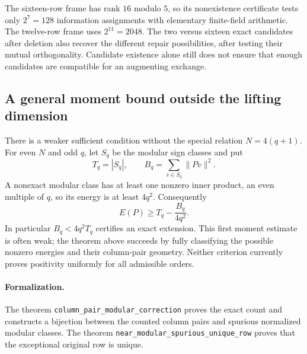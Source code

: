 The sixteen-row frame has rank $16$ modulo $5$, so its nonexistence
certificate tests only $2^7=128$ information assignments with elementary
finite-field arithmetic. The twelve-row frame uses $2^{11}=2048$.
The two versus sixteen exact candidates after deletion also recover
the different repair possibilities, after testing their mutual
orthogonality. Candidate existence alone still does not ensure that
enough candidates are compatible for an augmenting exchange.

\subsection{A general moment bound outside the lifting dimension}
There is a weaker sufficient condition without the special relation
$N=4(q+1)$. For even $N$ and odd $q$, let $S_q$ be the modular sign
classes and put
\[
 T_q=|S_q|,\qquad B_q=\sum_{v\in S_q}\|Pv\|^2.
\]
A nonexact modular class has at least one nonzero inner product, an
even multiple of $q$, so its energy is at least $4q^2$. Consequently
\[
 E(P)\ge T_q-\frac{B_q}{4q^2}.
\]
In particular $B_q<4q^2T_q$ certifies an exact extension. This first
moment estimate is often weak; the theorem above succeeds by fully
classifying the possible nonzero energies and their column-pair
geometry. Neither criterion currently proves positivity uniformly
for all admissible orders.

\paragraph{Formalization.} The theorem \texttt{column\_\allowbreak pair\_\allowbreak modular\_\allowbreak correction} proves the exact count and constructs a bijection between the counted column pairs and spurious normalized modular classes. The theorem \texttt{near\_\allowbreak modular\_\allowbreak spurious\_\allowbreak unique\_\allowbreak row} proves that the exceptional original row is unique.
